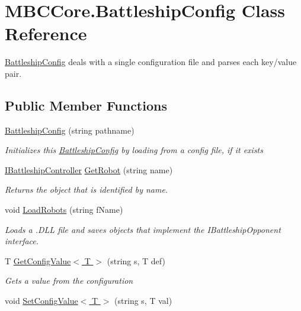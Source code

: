 \hypertarget{class_m_b_c_core_1_1_battleship_config}{\section{M\-B\-C\-Core.\-Battleship\-Config Class Reference}
\label{class_m_b_c_core_1_1_battleship_config}
}


\hyperlink{class_m_b_c_core_1_1_battleship_config}{Battleship\-Config} deals with a single configuration file and parses each key/value pair. 


\subsection*{Public Member Functions}
\begin{DoxyCompactItemize}
\item 
\hypertarget{class_m_b_c_core_1_1_battleship_config_a0f70da12064d2f013add8c0c42125995}{\hyperlink{class_m_b_c_core_1_1_battleship_config_a0f70da12064d2f013add8c0c42125995}{Battleship\-Config} (string pathname)}\label{class_m_b_c_core_1_1_battleship_config_a0f70da12064d2f013add8c0c42125995}

\begin{DoxyCompactList}\small\item\em Initializes this \hyperlink{class_m_b_c_core_1_1_battleship_config}{Battleship\-Config} by loading from a config file, if it exists\end{DoxyCompactList}\item 
\hyperlink{interface_m_b_c_core_1_1_i_battleship_controller}{I\-Battleship\-Controller} \hyperlink{class_m_b_c_core_1_1_battleship_config_a379d4f6e1b71b8c3c999d8e976c911ef}{Get\-Robot} (string name)
\begin{DoxyCompactList}\small\item\em Returns the object that is identified by name.\end{DoxyCompactList}\item 
void \hyperlink{class_m_b_c_core_1_1_battleship_config_a9868e4522f2136e9ba1144bdb30d5d76}{Load\-Robots} (string f\-Name)
\begin{DoxyCompactList}\small\item\em Loads a .D\-L\-L file and saves objects that implement the I\-Battleship\-Opponent interface.\end{DoxyCompactList}\item 
T \hyperlink{class_m_b_c_core_1_1_battleship_config_a35956970fff49dd8c4cb7a34ba22cf5e}{Get\-Config\-Value$<$ T $>$} (string s, T def)
\begin{DoxyCompactList}\small\item\em Gets a value from the configuration\end{DoxyCompactList}\item 
\hypertarget{class_m_b_c_core_1_1_battleship_config_a73f17d9d814af4dc69f2afc38d3c8da9}{void \hyperlink{class_m_b_c_core_1_1_battleship_config_a73f17d9d814af4dc69f2afc38d3c8da9}{Set\-Config\-Value$<$ T $>$} (string s, T val)}\label{class_m_b_c_core_1_1_battleship_config_a73f17d9d814af4dc69f2afc38d3c8da9}


\end{DoxyCompactItemize}
